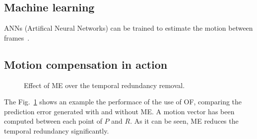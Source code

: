 \subsection{Machine learning}
ANNs (Artifical Neural Networks) can be trained to estimate the
motion between frames~\cite{dosovitskiy2015flownet}.

\subsection{Motion compensation in action}
\begin{figure}
  \caption{Effect of ME over the temporal redundancy removal.}
  \label{fig:MC}
\end{figure}
The Fig.~\ref{fig:MC} shows an example the performace of the use of
OF, comparing the prediction error generated with and without ME. A
motion vector has been computed between each point of $P$ and $R$. As
it can be seen, ME reduces the temporal redundancy significantly.

